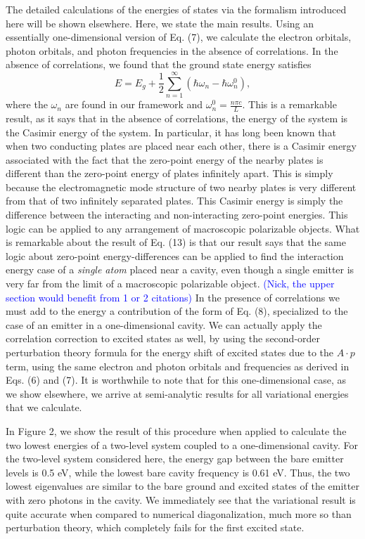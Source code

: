 \documentclass[aps,prl,twocolumn,
	groupedaddress,superscriptaddress,
	amsfonts,amssymb,amsmath,floatfix,
	citeautoscript]{revtex4-1}
\newcommand{\Jadd}[1]{\textcolor{blue}{#1}}
\begin{document}
The detailed calculations of the energies of states via the formalism introduced here will be shown elsewhere. Here, we state the main results. Using an essentially one-dimensional version of Eq. (7), we calculate the electron orbitals, photon orbitals, and photon frequencies in the absence of correlations. In the absence of correlations, we found that the ground state energy satisfies
\begin{equation}
E = E_g + \frac{1}{2}\sum\limits_{n=1}^{\infty}(\hbar\omega_n - \hbar\omega_n^0),
\end{equation}
where the $\omega_n$ are found in our framework and $\omega_n^0 = \frac{n\pi c}{L}$. This is a remarkable result, as it says that in the absence of correlations, the energy of the system is the Casimir energy of the system. In particular, it has long been known that when two conducting plates are placed near each other, there is a Casimir energy associated with the fact that the zero-point energy of the nearby plates is different than the zero-point energy of plates infinitely apart. This is simply because the electromagnetic mode structure of two nearby plates is very different from that of two infinitely separated plates. This Casimir energy is simply the difference between the interacting and non-interacting zero-point energies. This logic can be applied to any arrangement of macroscopic polarizable objects. What is remarkable about the result of Eq. (13) is that our result says that the same logic about zero-point energy-differences can be applied to find the interaction energy case of a \textit{single atom} placed near a cavity, even though a single emitter is very far from the limit of a macroscopic polarizable object. 
\Jadd{(Nick, the upper section would benefit from 1 or 2 citations)}
In the presence of correlations  we must add to the energy a contribution of the form of Eq. (8), specialized to the case of an emitter in a one-dimensional cavity. We can actually apply the correlation correction to excited states as well, by using the second-order perturbation theory formula for the energy shift of excited states due to the $A \cdot p$ term, using the same electron and photon orbitals and frequencies as derived in Eqs. (6) and (7). It is worthwhile to note that for this one-dimensional case, as we show elsewhere, we arrive at semi-analytic results for all variational energies that we calculate.

In Figure 2, we show the result of this procedure when applied to calculate the two lowest energies of a two-level system coupled to a one-dimensional cavity. For the two-level system considered here, the energy gap between the bare emitter levels is 0.5 eV, while the lowest bare cavity frequency is 0.61 eV. Thus, the two lowest eigenvalues are similar to the bare ground and excited states of the emitter with zero photons in the cavity.  We immediately see that the variational result is quite accurate when compared to numerical diagonalization, much more so than perturbation theory, which completely fails for the first excited state. 
\end{document}
